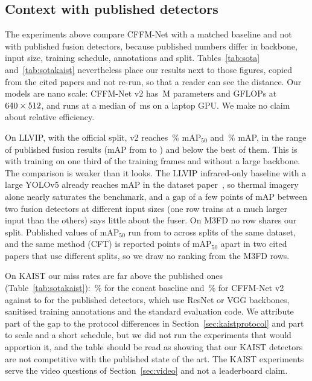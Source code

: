 \subsection{Context with published detectors}
\label{sec:sota}
The experiments above compare CFFM-Net with a matched baseline and not with published fusion detectors, because published numbers differ in backbone, input size, training schedule, annotations and split. Tables~\ref{tab:sota} and~\ref{tab:sotakaist} nevertheless place our results next to those figures, copied from the cited papers and not re-run, so that a reader can see the distance. Our models are nano scale: CFFM-Net v2 has \latLocalVtwoParamsM{}\,M parameters and \latLocalVtwoGflops{} GFLOPs at $640{}\times512{}$, and runs at a median of \latLocalVtwoMedianMs{}\,ms on a laptop GPU. We make no claim about relative efficiency.




On LLVIP, with the official split, v2 reaches \resLlvipCffmVtwoMeanMapFifty{}\,\% mAP$_{50}$ and \resLlvipCffmVtwoMeanMap{}\,\% mAP, in the range of published fusion results (mAP from \sotaLlvipFusionMapMin{} to \sotaLlvipFusionMapMax{}) and below the best of them. This is with training on one third of the training frames and without a large backbone. The comparison is weaker than it looks. The LLVIP infrared-only baseline with a large YOLOv5 already reaches \sotaLlvipIrOnlyMap{} mAP in the dataset paper~\cite{jia2021llvip}, so thermal imagery alone nearly saturates the benchmark, and a gap of a few points of mAP between two fusion detectors at different input sizes (one row trains at a much larger input than the others) says little about the fuser. On M3FD no row shares our split. Published values of mAP$_{50}$ run from \sotaMfdMapFiftyMin{} to \sotaMfdMapFiftyMax{} across splits of the same dataset, and the same method (CFT) is reported \sotaMfdSplitSwing{} points of mAP$_{50}$ apart in two cited papers that use different splits, so we draw no ranking from the M3FD rows.

On KAIST our miss rates are far above the published ones (Table~\ref{tab:sotakaist}): \kstConcatAllMr{}\,\% for the concat baseline and \kstCffmAllMr{}\,\% for CFFM-Net v2 against \sotaKaistMrMin{} to \sotaKaistMrMax{} for the published detectors, which use ResNet or VGG backbones, sanitised training annotations and the standard evaluation code. We attribute part of the gap to the protocol differences in Section~\ref{sec:kaistprotocol} and part to scale and a short schedule, but we did not run the experiments that would apportion it, and the table should be read as showing that our KAIST detectors are not competitive with the published state of the art. The KAIST experiments serve the video questions of Section~\ref{sec:video} and not a leaderboard claim.


